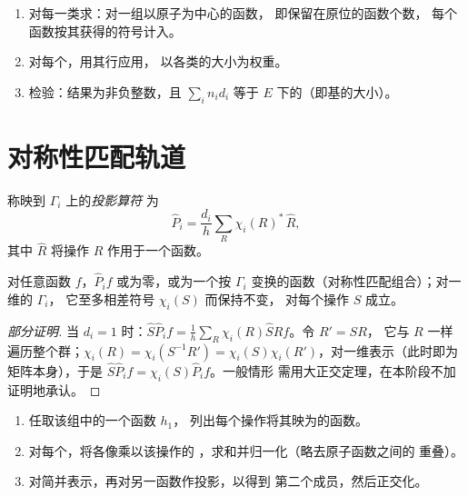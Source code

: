 \begin{method}[约化表示]\label{met:b3:group-theory-applied:reduce}
\begin{enumerate}
  \item 对每一类求：对一组以原子为中心的函数，
        即保留在原位的函数个数，
        每个函数按其获得的符号计入。
  \item 对每个，用其行应用，
        以各类的大小为权重。
  \item 检验：结果为非负整数，且 $\sum_in_id_i$
        等于 $E$ 下的（即基的大小）。
\end{enumerate}
\end{method}

\section{对称性匹配轨道}

\begin{definition}[投影算符]\label{def:b3:group-theory-applied:projection}
称映到 $\Gamma_i$ 上的\emph{投影算符}
为
\[
\hat P_i = \frac{d_i}{h}\sum_R\chi_i(R)^*\,\hat R,
\]
其中 $\hat R$ 将操作 $R$ 作用于一个函数。
\end{definition}

\begin{proposition}[投影算符的作用]\label{prop:b3:group-theory-applied:projection}
对任意函数 $f$，$\hat P_if$ 或为零，或为一个按
$\Gamma_i$ 变换的函数（对称性匹配组合）；对一维的 $\Gamma_i$，
它至多相差符号 $\chi_i(S)$ 而保持不变，
对每个操作 $S$ 成立。
\end{proposition}

\begin{proof}[部分证明]
当 $d_i = 1$ 时：$\hat S\hat P_if = \frac1h\sum_R\chi_i(R)\hat S\hat Rf$。令 $R' = SR$，
它与 $R$ 一样遍历整个群；$\chi_i(R) = \chi_i(S^{-1}R') =
\chi_i(S)\chi_i(R')$，对一维表示（此时即为
矩阵本身），于是 $\hat S\hat P_if = \chi_i(S)\hat P_if$。一般情形
需用大正交定理，在本阶段不加证明地承认。
\end{proof}

\begin{method}[构造对称性匹配组合]\label{met:b3:group-theory-applied:salc}
\begin{enumerate}
  \item 任取该组中的一个函数 $h_1$，
        列出每个操作将其映为的函数。
  \item 对每个，将各像乘以该操作的
        ，求和并归一化（略去原子函数之间的
        重叠）。
  \item 对简并表示，再对另一函数作投影，以得到
        第二个成员，然后正交化。
\end{enumerate}
\end{method}

